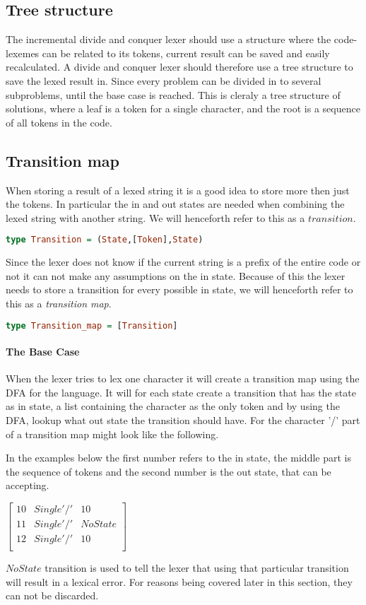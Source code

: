 \subsection{Tree structure}
The incremental divide and conquer lexer should use a structure where the
code-lexemes can be related to its tokens, current result can be saved and
easily recalculated. A divide and conquer lexer should therefore use a tree
structure to save the lexed result in. Since every problem can be divided in to
several subproblems, until the base case is reached. This is cleraly a tree
structure of solutions, where a leaf is a token for a single character, and the
root is a sequence of all tokens in the code.  

\subsection{Transition map}
When storing a result of a lexed string it is a good idea to store more then
just the tokens. In particular the in and out states are needed when combining
the lexed string with another string. We will henceforth refer to this as a
$transition$.
\begin{lstlisting}[language=Haskell]
type Transition = (State,[Token],State)
\end{lstlisting}
Since the lexer does not know if the current string is a prefix of the entire
code or not it can not make any assumptions on the in state. Because of this the
lexer needs to store a transition for every possible in state, we will henceforth
refer to this as a \emph{transition map}.
\begin{lstlisting}[language=Haskell]
type Transition_map = [Transition]
\end{lstlisting}
\paragraph{The Base Case}
When the lexer tries to lex one character it will create a transition
map using the DFA for the language. It will for each state create a transition
that has the state as in state, a list containing the character as the only
token and by using the DFA, lookup what out state the transition should have.
For the character '/' part of a transition map might look like the following.

In the
examples below the first number refers to the in state, the middle part is the
sequence of tokens and the second number is the out state, that can be accepting.
\begin{center}
$\left[\begin{array}{ccc}
10&Single '/'&10\\
11&Single '/'&NoState\\
12&Single '/'&10\\
\end{array}\right]$
\end{center}
$NoState$ transition is used to tell the lexer that using that particular 
transition will result in a lexical error. For reasons being covered later in
this section, they can not be discarded.


